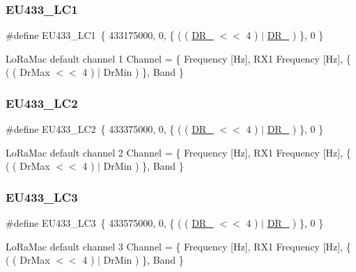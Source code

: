 \subsubsection{\texorpdfstring{E\+U433\+\_\+\+L\+C1}{EU433\_LC1}}
{\footnotesize\ttfamily \#define E\+U433\+\_\+\+L\+C1~\{ 433175000, 0, \{ ( ( \hyperlink{group__REGION_ga872e12c82020c02a7f70a1c6ed1375df}{D\+R\+\_} $<$$<$ 4 ) $\vert$ \hyperlink{group__REGION_ga6c4ef966b4f3d5eb7597b087f2b97095}{D\+R\+\_} ) \}, 0 \}}

Lo\+Ra\+Mac default channel 1 Channel = \{ Frequency \mbox{[}Hz\mbox{]}, R\+X1 Frequency \mbox{[}Hz\mbox{]}, \{ ( ( Dr\+Max $<$$<$ 4 ) $\vert$ Dr\+Min ) \}, Band \} \mbox{\label{group__REGIONEU433_gae1c54a191172715ddc7c0c7f900009b7}} 
\subsubsection{\texorpdfstring{E\+U433\+\_\+\+L\+C2}{EU433\_LC2}}
{\footnotesize\ttfamily \#define E\+U433\+\_\+\+L\+C2~\{ 433375000, 0, \{ ( ( \hyperlink{group__REGION_ga872e12c82020c02a7f70a1c6ed1375df}{D\+R\+\_} $<$$<$ 4 ) $\vert$ \hyperlink{group__REGION_ga6c4ef966b4f3d5eb7597b087f2b97095}{D\+R\+\_} ) \}, 0 \}}

Lo\+Ra\+Mac default channel 2 Channel = \{ Frequency \mbox{[}Hz\mbox{]}, R\+X1 Frequency \mbox{[}Hz\mbox{]}, \{ ( ( Dr\+Max $<$$<$ 4 ) $\vert$ Dr\+Min ) \}, Band \} \mbox{\label{group__REGIONEU433_ga4e6b881bf178cbd3cc8ab2716a24a231}} 
\subsubsection{\texorpdfstring{E\+U433\+\_\+\+L\+C3}{EU433\_LC3}}
{\footnotesize\ttfamily \#define E\+U433\+\_\+\+L\+C3~\{ 433575000, 0, \{ ( ( \hyperlink{group__REGION_ga872e12c82020c02a7f70a1c6ed1375df}{D\+R\+\_} $<$$<$ 4 ) $\vert$ \hyperlink{group__REGION_ga6c4ef966b4f3d5eb7597b087f2b97095}{D\+R\+\_} ) \}, 0 \}}

Lo\+Ra\+Mac default channel 3 Channel = \{ Frequency \mbox{[}Hz\mbox{]}, R\+X1 Frequency \mbox{[}Hz\mbox{]}, \{ ( ( Dr\+Max $<$$<$ 4 ) $\vert$ Dr\+Min ) \}, Band \} \mbox{\label{group__REGIONEU433_ga5b7094c08ac59b66204c07232e25671f}} 
